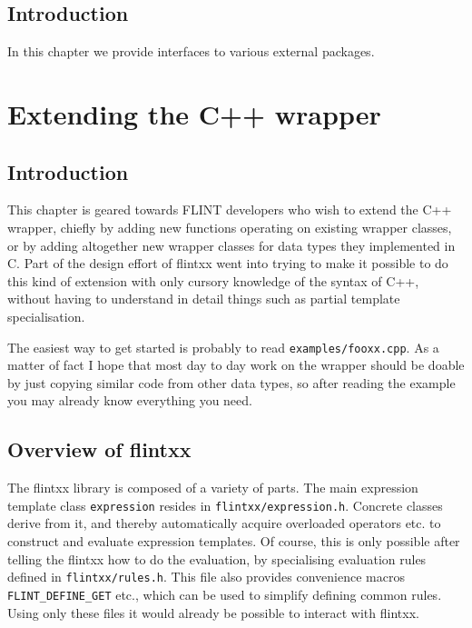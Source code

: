 \documentclass[a4paper,10pt]{book}
\newcommand{\code}{\lstinline}
\begin{document}
{{\section{Introduction}

In this chapter we provide interfaces to various external packages.



\appendix
\chapter{Extending the C++ wrapper}
\label{app:genericxx}

\section{Introduction}

This chapter is geared towards FLINT developers who wish to extend the C++
wrapper, chiefly by adding new functions operating on existing wrapper classes,
or by adding altogether new wrapper classes for data types they implemented in
C. Part of the design effort of flintxx went into trying to make it possible to
do this kind of extension with only cursory knowledge of the syntax of C++,
without having to understand in detail things such as partial template
specialisation.

The easiest way to get started is probably to read \code{examples/fooxx.cpp}.
As a matter of fact I hope that most day to day work on the wrapper should be
doable by just copying similar code from other data types, so after reading the
example you may already know everything you need.

\section{Overview of flintxx}

The flintxx library is composed of a variety of parts. The main expression
template class \code{expression} resides in \code{flintxx/expression.h}.
Concrete classes derive from it, and thereby automatically acquire overloaded
operators etc. to construct and evaluate expression templates. Of course, this
is only possible after telling the flintxx how to do the evaluation, by
specialising evaluation rules defined in \code{flintxx/rules.h}. This file also
provides convenience macros \code{FLINT_DEFINE_GET} etc., which can be used to
simplify defining common rules. Using only these files it would already be
possible to interact with flintxx.

}}
\end{document}
